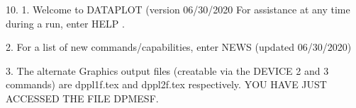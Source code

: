 10.
1. Welcome to DATAPLOT (version 06/30/2020  For assistance at
   any time during a run, enter HELP   .

2. For a list of new commands/capabilities,
   enter NEWS  (updated 06/30/2020)

3. The alternate Graphics output files (creatable
   via the DEVICE 2 and 3 commands) are
   dppl1f.tex and dppl2f.tex respectively.
YOU HAVE JUST ACCESSED THE FILE DPMESF.
